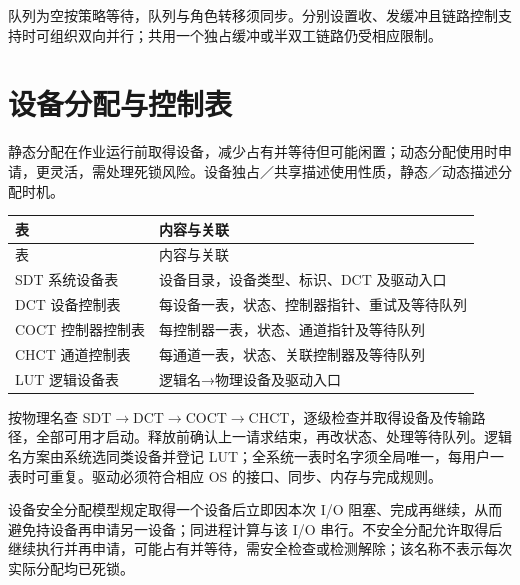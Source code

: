 队列为空按策略等待，队列与角色转移须同步。分别设置收、发缓冲且链路控制支持时可组织双向并行；共用一个独占缓冲或半双工链路仍受相应限制。

\section{设备分配与控制表}\label{OS05-allocation}

静态分配在作业运行前取得设备，减少占有并等待但可能闲置；动态分配使用时申请，更灵活，需处理死锁风险。设备独占／共享描述使用性质，静态／动态描述分配时机。

\par\smallskip
{\fontsize{9.3}{12}\selectfont\setlength{\tabcolsep}{2.5pt}\setlength{\LTleft}{0pt}\setlength{\LTright}{0pt}
\begin{longtable}{@{}>{\raggedright\arraybackslash}p{}>{\raggedright\arraybackslash}p{}@{}}
\toprule
表 & 内容与关联 \\

\midrule\endfirsthead\toprule
表 & 内容与关联 \\

\midrule\endhead\bottomrule\endfoot
SDT 系统设备表 & 设备目录，设备类型、标识、DCT 及驱动入口 \\

DCT 设备控制表 & 每设备一表，状态、控制器指针、重试及等待队列 \\

COCT 控制器控制表 & 每控制器一表，状态、通道指针及等待队列 \\

CHCT 通道控制表 & 每通道一表，状态、关联控制器及等待队列 \\

LUT 逻辑设备表 & 逻辑名→物理设备及驱动入口 \\

\end{longtable}}
\par\smallskip

按物理名查 SDT\ensuremath{\to}DCT\ensuremath{\to}COCT\ensuremath{\to}CHCT，逐级检查并取得设备及传输路径，全部可用才启动。释放前确认上一请求结束，再改状态、处理等待队列。逻辑名方案由系统选同类设备并登记 LUT；全系统一表时名字须全局唯一，每用户一表时可重复。驱动必须符合相应 OS 的接口、同步、内存与完成规则。

设备安全分配模型规定取得一个设备后立即因本次 I/O 阻塞、完成再继续，从而避免持设备再申请另一设备；同进程计算与该 I/O 串行。不安全分配允许取得后继续执行并再申请，可能占有并等待，需安全检查或检测解除；该名称不表示每次实际分配均已死锁。

